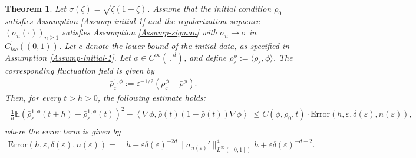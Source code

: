 \documentclass[10pt,a4paper]{amsart}
\newtheorem{theorem}{Theorem}
\def\geq{\geqslant}
\def\leq{\leqslant}
\begin{document}
\begin{theorem}
Let $\sigma(\zeta)=\sqrt{\zeta(1-\zeta)}$. Assume that the initial condition $\rho_0$ satisfies Assumption \ref{Assump-initial-1} and the regularization sequence $(\sigma_n(\cdot))_{n \geq 1}$ satisfies Assumption \ref{Assump-sigman} with $\sigma_n\rightarrow\sigma$ in $C^1_{loc}((0,1))$. Let $c$ denote the lower bound of the initial data, as specified in Assumption \ref{Assump-initial-1}. Let $\phi \in C^{\infty}(\mathbb{T}^d)$, and define $\rho_{\varepsilon}^{\phi} := \langle \rho_{\varepsilon}, \phi \rangle$. The corresponding fluctuation field is given by
\begin{align*}
\bar{\rho}_{\varepsilon}^{1,\phi} := \varepsilon^{-1/2}(\rho_{\varepsilon}^{\phi} - \bar{\rho}^{\phi}).
\end{align*}
Then, for every $t > h > 0$, the following estimate holds:
\begin{align*}
\left| \frac{1}{h} \mathbb{E} \left( \bar{\rho}_{\varepsilon}^{1,\phi}(t+h) - \bar{\rho}_{\varepsilon}^{1,\phi}(t) \right)^2 
- \left\langle \nabla \phi, \bar{\rho}(t)(1 - \bar{\rho}(t)) \nabla \phi \right\rangle \right|
\leq C(\phi, \rho_0, t) \cdot \mathrm{Error}(h, \varepsilon, \delta(\varepsilon), n(\varepsilon)),
\end{align*}
where the error term is given by
\begin{align*}
\mathrm{Error}(h, \varepsilon, \delta(\varepsilon), n(\varepsilon)) =\ & h 
+ \varepsilon \delta(\varepsilon)^{-2d} \|\sigma_{n(\varepsilon)}'\|_{L^{\infty}([0,1])}^4 h + \varepsilon \delta(\varepsilon)^{-d-2}. 
\end{align*}
\end{theorem}
\end{document}
